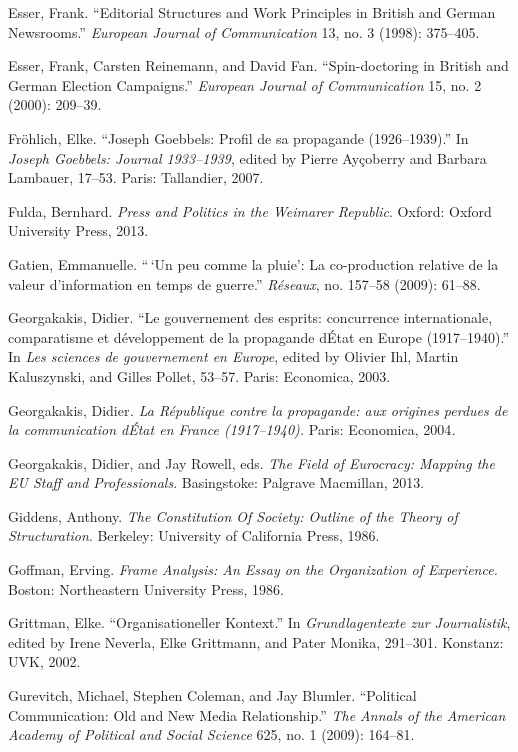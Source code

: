 \documentclass{tufte-handout}
\begin{document}
\begin{hangparas}{.25in}{1}
Esser, Frank. ``Editorial Structures and Work Principles in British and
German Newsrooms.'' \emph{European Journal of Communication} 13, no. 3
(1998): 375--405.

Esser, Frank, Carsten Reinemann, and David Fan. ``Spin-doctoring in
British and German Election Campaigns.'' \emph{European Journal of
Communication} 15, no. 2 (2000): 209--39.

Fröhlich, Elke. ``Joseph Goebbels: Profil de sa propagande
(1926--1939).'' In \emph{Joseph Goebbels: Journal 1933--1939}, edited by
Pierre Ayçoberry and Barbara Lambauer, 17--53. Paris: Tallandier, 2007.

Fulda, Bernhard. \emph{Press and Politics in the Weimarer Republic}.
Oxford: Oxford University Press, 2013.

Gatien, Emmanuelle. ``\,`Un peu comme la pluie': La co-production
relative de la valeur d'information en temps de guerre.''
\emph{Réseaux}, no. 157--58 (2009): 61--88.

Georgakakis, Didier. ``Le gouvernement des esprits: concurrence
internationale, comparatisme et développement de la propagande
d\textquotesingle État en Europe (1917--1940).'' In \emph{Les sciences
de gouvernement en Europe}, edited by Olivier Ihl, Martin Kaluszynski,
and Gilles Pollet, 53--57. Paris: Economica, 2003.

Georgakakis, Didier\emph{. La République contre la propagande: aux
origines perdues de la communication d\textquotesingle État en France
(1917--1940).} Paris: Economica, 2004\emph{.}

Georgakakis, Didier, and Jay Rowell, eds. \emph{The Field of Eurocracy:
Mapping the EU Staff and Professionals}. Basingstoke: Palgrave
Macmillan, 2013.

Giddens, Anthony. \emph{The Constitution Of Society: Outline of the
Theory of Structuration}. Berkeley: University of California Press,
1986.

Goffman, Erving. \emph{Frame Analysis: An Essay on the Organization of
Experience.} Boston: Northeastern University Press, 1986.

Grittman, Elke. ``Organisationeller Kontext.'' In \emph{Grundlagentexte
zur Journalistik}, edited by Irene Neverla, Elke Grittmann, and Pater
Monika, 291--301. Konstanz: UVK, 2002.

Gurevitch, Michael, Stephen Coleman, and Jay Blumler. ``Political
Communication: Old and New Media Relationship.'' \emph{The Annals of the
American Academy of Political and Social Science} 625, no. 1 (2009):
164--81.


\end{hangparas}
\end{document}

